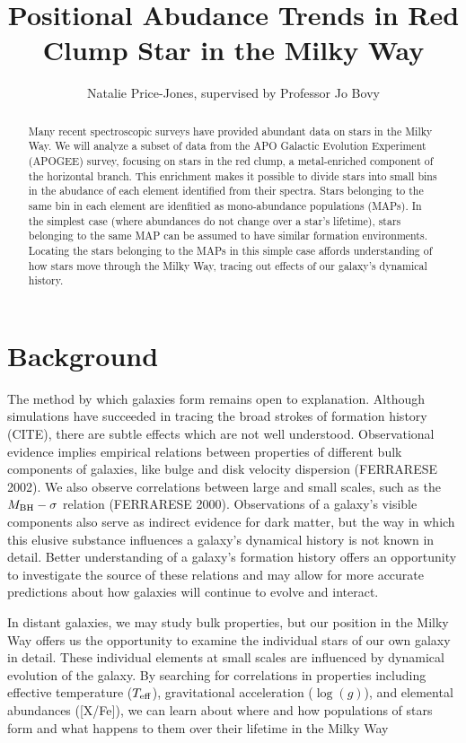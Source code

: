 \documentclass[preprint]{aastex}
\begin{document}
\title{Positional Abudance Trends in Red Clump Star in the Milky Way}
\author{Natalie Price-Jones, supervised by Professor Jo Bovy}

\begin{abstract}
Many recent spectroscopic surveys have provided abundant data on stars in the Milky Way. We will analyze a subset of data from the APO Galactic Evolution Experiment (APOGEE) survey, focusing on stars in the red clump, a metal-enriched component of the horizontal branch. This enrichment makes it possible to divide stars into small bins in the abudance of each element identified from their spectra. Stars belonging to the same bin in each element are idenfitied as mono-abundance populations (MAPs). In the simplest case (where abundances do not change over a star's lifetime), stars belonging to the same MAP can be assumed to have similar formation environments. Locating the stars belonging to the MAPs in this simple case affords understanding of how stars move through the Milky Way, tracing out effects of our galaxy's dynamical history.
\end{abstract}

\section{Background}
\label{sec:back}
The method by which galaxies form remains open to explanation. Although simulations have succeeded in tracing the broad strokes of formation history (CITE), there are subtle effects which are not well understood. Observational evidence implies empirical relations between properties of different bulk components of galaxies, like bulge and disk velocity dispersion (FERRARESE 2002). We also observe correlations between large and small scales, such as the $M_{\rm BH}-\sigma$ relation (FERRARESE 2000). Observations of a galaxy's visible components also serve as indirect evidence for dark matter, but the way in which this elusive substance influences a galaxy's dynamical history is not known in detail. Better understanding of a galaxy's formation history offers an opportunity to investigate the source of these relations and may allow for more accurate predictions about how galaxies will continue to evolve and interact.

In distant galaxies, we may study bulk properties, but our position in the Milky Way offers us the opportunity to examine the individual stars of our own galaxy in detail. These individual elements at small scales are influenced by dynamical evolution of the galaxy. By searching for correlations in properties including effective temperature ($T_{\rm eff}$), gravitational acceleration ($\log(g)$), and elemental abundances ([X/Fe]), we can learn about where and how populations of stars form and what happens to them over their lifetime in the Milky Way 
\end{document}
